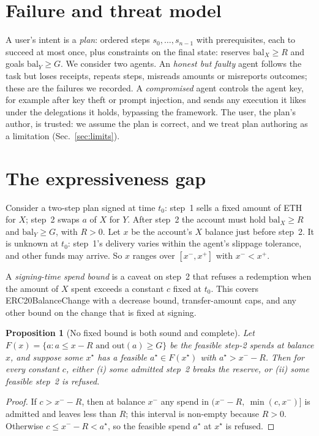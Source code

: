 \documentclass[conference]{IEEEtran}
\newtheorem{proposition}{Proposition}
\begin{document}
\section{Failure and threat model}\label{sec:threat}

A user's intent is a \emph{plan}: ordered steps $s_0,\dots,s_{n-1}$ with prerequisites, each to succeed at most
once, plus constraints on the final state: reserves $\mathrm{bal}_X \ge R$ and goals $\mathrm{bal}_Y \ge G$. We
consider two agents. An \emph{honest but faulty} agent follows the task but loses receipts, repeats steps, misreads
amounts or misreports outcomes; these are the failures we recorded. A \emph{compromised} agent controls the agent
key, for example after key theft or prompt injection, and sends any execution it likes under the delegations it holds,
bypassing the framework. The user, the plan's author, is trusted: we assume the plan is correct, and we treat plan
authoring as a limitation (Sec.~\ref{sec:limits}).

\section{The expressiveness gap}\label{sec:gap}

Consider a two-step plan signed at time $t_0$: step~1 sells a fixed amount of ETH for $X$; step~2 swaps $a$ of
$X$ for $Y$. After step~2 the account must hold $\mathrm{bal}_X \ge R$ and $\mathrm{bal}_Y \ge G$, with $R > 0$. Let
$x$ be the account's $X$ balance just before step~2. It is unknown at $t_0$: step~1's delivery varies within the
agent's slippage tolerance, and other funds may arrive. So $x$ ranges over $[x^-, x^+]$ with $x^- < x^+$.

A \emph{signing-time spend bound} is a caveat on step~2 that refuses a redemption when the amount of $X$ spent exceeds
a constant $c$ fixed at $t_0$. This covers ERC20BalanceChange with a decrease bound, transfer-amount caps, and any other
bound on the change that is fixed at signing.

\begin{proposition}[No fixed bound is both sound and complete]
Let $F(x)=\{a : a \le x - R \text{ and } \mathrm{out}(a) \ge G\}$ be the feasible step-2 spends at balance $x$, and
suppose some $x^\star$ has a feasible $a^\star \in F(x^\star)$ with $a^\star > x^- - R$. Then for every constant $c$,
either (i) some admitted step~2 breaks the reserve, or (ii) some feasible step~2 is refused.
\end{proposition}
\begin{proof}
If $c > x^- - R$, then at balance $x^-$ any spend in $(x^- - R,\ \min(c, x^-)]$ is admitted and leaves less than $R$;
this interval is non-empty because $R > 0$. Otherwise $c \le x^- - R < a^\star$, so the feasible spend $a^\star$ at
$x^\star$ is refused.
\end{proof}
\end{document}
